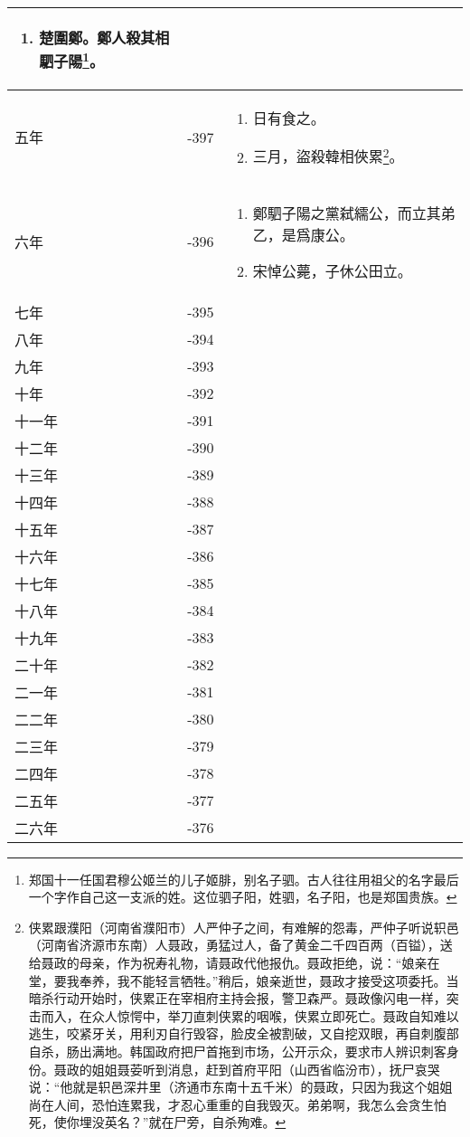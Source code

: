 \begin{longtable}{|>{\centering\scriptsize}m{2em}|>{\centering\scriptsize}m{1.3em}|>{\centering}m{8.8em}|}
\begin{enumerate}
    \tiny
  \item 楚圍鄭。鄭人殺其相駟子陽\footnote{郑国十一任国君穆公姬兰的儿子姬腓，别名子驷。古人往往用祖父的名字最后一个字作自己这一支派的姓。这位驷子阳，姓驷，名子阳，也是郑国贵族。}。
  \end{enumerate} \tabularnewline\hline
  五年 & -397 & \begin{enumerate}
    \tiny
  \item 日有食之。
  \item 三月，盜殺韓相俠累\footnote{侠累跟濮阳（河南省濮阳市）人严仲子之间，有难解的怨毒，严仲子听说轵邑（河南省济源市东南）人聂政，勇猛过人，备了黄金二千四百两（百镒），送给聂政的母亲，作为祝寿礼物，请聂政代他报仇。聂政拒绝，说：“娘亲在堂，要我奉养，我不能轻言牺牲。”稍后，娘亲逝世，聂政才接受这项委托。当暗杀行动开始时，侠累正在宰相府主持会报，警卫森严。聂政像闪电一样，突击而入，在众人惊愕中，举刀直刺侠累的咽喉，侠累立即死亡。聂政自知难以逃生，咬紧牙关，用利刃自行毁容，脸皮全被割破，又自挖双眼，再自刺腹部自杀，肠出满地。韩国政府把尸首拖到市场，公开示众，要求市人辨识刺客身份。聂政的姐姐聂荌听到消息，赶到首府平阳（山西省临汾市），抚尸哀哭说：“他就是轵邑深井里（济通市东南十五千米）的聂政，只因为我这个姐姐尚在人间，恐怕连累我，才忍心重重的自我毁灭。弟弟啊，我怎么会贪生怕死，使你埋没英名？”就在尸旁，自杀殉难。}。
  \end{enumerate} \tabularnewline\hline
  六年 & -396 & \begin{enumerate}
    \tiny
  \item 鄭駟子陽之黨弑繻公，而立其弟乙，是爲康公。
  \item 宋悼公薨，子休公田立。
  \end{enumerate} \tabularnewline\hline
  七年 & -395 & \tabularnewline\hline
  八年 & -394 & \tabularnewline\hline
  九年 & -393 & \tabularnewline\hline
  十年 & -392 & \tabularnewline\hline
  十一年 & -391 & \tabularnewline\hline
  十二年 & -390 & \tabularnewline\hline
  十三年 & -389 & \tabularnewline\hline
  十四年 & -388 & \tabularnewline\hline
  十五年 & -387 & \tabularnewline\hline
  十六年 & -386 & \tabularnewline\hline
  十七年 & -385 & \tabularnewline\hline
  十八年 & -384 & \tabularnewline\hline
  十九年 & -383 & \tabularnewline\hline
  二十年 & -382 & \tabularnewline\hline
  二一年 & -381 & \tabularnewline\hline
  二二年 & -380 & \tabularnewline\hline
  二三年 & -379 & \tabularnewline\hline
  二四年 & -378 & \tabularnewline\hline
  二五年 & -377 & \tabularnewline\hline
  二六年 & -376 & \tabularnewline
  \bottomrule
\end{longtable}

